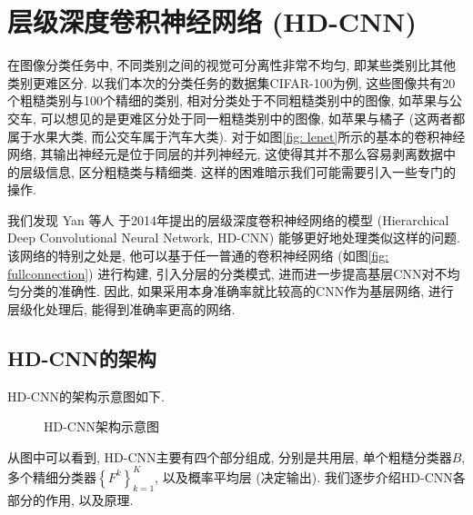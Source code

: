 \documentclass[lang=cn, 11pt,   a4paper]{elegantpaper}
\begin{document}
\section{层级深度卷积神经网络 (HD-CNN)}
在图像分类任务中, 不同类别之间的视觉可分离性非常不均匀, 即某些类别比其他类别更难区分. 以我们本次的分类任务的数据集CIFAR-100为例, 这些图像共有20个粗糙类别与100个精细的类别, 相对分类处于不同粗糙类别中的图像, 如苹果与公交车, 可以想见的是更难区分处于同一粗糙类别中的图像, 如苹果与橘子 (这两者都属于水果大类, 而公交车属于汽车大类). 对于如图\ref{fig: lenet}所示的基本的卷积神经网络, 其输出神经元是位于同层的并列神经元, 这使得其并不那么容易剥离数据中的层级信息, 区分粗糙类与精细类. 这样的困难暗示我们可能需要引入一些专门的操作.

我们发现 Yan 等人 \cite{yan15} 于2014年提出的层级深度卷积神经网络的模型 (Hierarchical Deep Convolutional Neural Network, HD-CNN) 能够更好地处理类似这样的问题. 该网络的特别之处是, 他可以基于任一普通的卷积神经网络 (如图\ref{fig: fullconnection}) 进行构建, 引入分层的分类模式, 进而进一步提高基层CNN对不均匀分类的准确性. 因此, 如果采用本身准确率就比较高的CNN作为基层网络, 进行层级化处理后, 能得到准确率更高的网络. 
\subsection{HD-CNN的架构}
HD-CNN的架构示意图如下.
\begin{figure}[H]
\label{fig: hdcnn}
\caption{HD-CNN架构示意图}
\end{figure}

从图中可以看到, HD-CNN主要有四个部分组成, 分别是共用层, 单个粗糙分类器$B$, 多个精细分类器$\left\{F^{k}\right\}_{k=1}^{K}$, 以及概率平均层 (决定输出). 我们逐步介绍HD-CNN各部分的作用, 以及原理.
\end{document}
